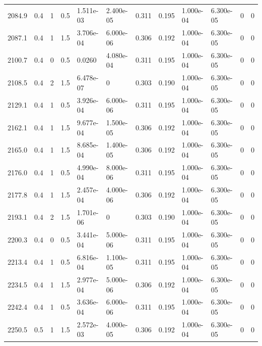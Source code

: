 \documentclass[preview]{standalone}
\begin{document}
{{{\begin{tabular}{L{1.2cm}C{1.2cm} C{0.3cm}C{0.5cm} C{1.4cm}C{1.4cm} C{1.4cm}C{1.4cm} C{1.6cm}C{1.6cm} C{1.6cm}C{1.6cm}}
  2084.9  &   0.4  & 1     & 0.5 &  1.511e-03  & 2.400e-05  &  0.311&   0.195& 1.000e-04 & 6.300e-05   &  0 & 0  \\ 
  2087.1  &   0.4  & 1     & 1.5 &  3.706e-04  & 6.000e-06  &  0.306&   0.192& 1.000e-04 & 6.300e-05   &  0 & 0  \\ 
  2100.7  &   0.4  & 0     & 0.5 &  0.0260  & 4.080e-04  &  0.311&   0.195& 1.000e-04 & 6.300e-05   &  0 & 0  \\ 
  2108.5  &   0.4  & 2     & 1.5 &  6.478e-07  & 0  &  0.303&   0.190& 1.000e-04 & 6.300e-05   &  0 & 0  \\ 
  2129.1  &   0.4  & 1     & 0.5 &  3.926e-04  & 6.000e-06  &  0.311&   0.195& 1.000e-04 & 6.300e-05   &  0 & 0  \\ 
  2162.1  &   0.4  & 1     & 1.5 &  9.677e-04  & 1.500e-05  &  0.306&   0.192& 1.000e-04 & 6.300e-05   &  0 & 0  \\ 
  2165.0  &   0.4  & 1     & 1.5 &  8.685e-04  & 1.400e-05  &  0.306&   0.192& 1.000e-04 & 6.300e-05   &  0 & 0  \\ 
  2176.0  &   0.4  & 1     & 0.5 &  4.990e-04  & 8.000e-06  &  0.311&   0.195& 1.000e-04 & 6.300e-05   &  0 & 0  \\ 
  2177.8  &   0.4  & 1     & 1.5 &  2.457e-04  & 4.000e-06  &  0.306&   0.192& 1.000e-04 & 6.300e-05   &  0 & 0  \\ 
  2193.1  &   0.4  & 2     & 1.5 &  1.701e-06  & 0  &  0.303&   0.190& 1.000e-04 & 6.300e-05   &  0 & 0  \\ 
  2200.3  &   0.4  & 0     & 0.5 &  3.441e-04  & 5.000e-06  &  0.311&   0.195& 1.000e-04 & 6.300e-05   &  0 & 0  \\ 
  2213.4  &   0.4  & 1     & 0.5 &  6.816e-04  & 1.100e-05  &  0.311&   0.195& 1.000e-04 & 6.300e-05   &  0 & 0  \\ 
  2234.5  &   0.4  & 1     & 1.5 &  2.977e-04  & 5.000e-06  &  0.306&   0.192& 1.000e-04 & 6.300e-05   &  0 & 0  \\ 
  2242.4  &   0.4  & 1     & 0.5 &  3.636e-04  & 6.000e-06  &  0.311&   0.195& 1.000e-04 & 6.300e-05   &  0 & 0  \\ 
  2250.5  &   0.5  & 1     & 1.5 &  2.572e-03  & 4.000e-05  &  0.306&   0.192& 1.000e-04 & 6.300e-05   &  0 & 0  \\ 
\hline 
\end{tabular} 

}}}
\end{document}
